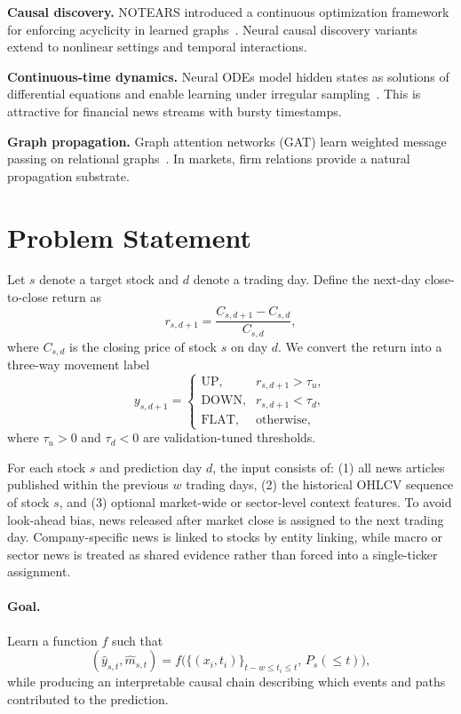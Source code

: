 \documentclass[sigconf,review]{acmart}
\begin{document}
\textbf{Causal discovery.} NOTEARS introduced a continuous optimization framework for enforcing acyclicity in learned graphs~\cite{zheng2018notears}. Neural causal discovery variants extend to nonlinear settings and temporal interactions.

\textbf{Continuous-time dynamics.} Neural ODEs model hidden states as solutions of differential equations and enable learning under irregular sampling~\cite{chen2018neuralode}. This is attractive for financial news streams with bursty timestamps.

\textbf{Graph propagation.} Graph attention networks (GAT) learn weighted message passing on relational graphs~\cite{velickovic2018gat}. In markets, firm relations provide a natural propagation substrate.

\section{Problem Statement}
Let \(s\) denote a target stock and \(d\) denote a trading day. Define the next-day close-to-close return as
\begin{equation}
r_{s,d+1} = \frac{C_{s,d+1} - C_{s,d}}{C_{s,d}},
\end{equation}
where \(C_{s,d}\) is the closing price of stock \(s\) on day \(d\). We convert the return into a three-way movement label
\begin{equation}
y_{s,d+1} =
\begin{cases}
\text{UP}, & r_{s,d+1} > \tau_u,\\
\text{DOWN}, & r_{s,d+1} < \tau_d,\\
\text{FLAT}, & \text{otherwise},
\end{cases}
\end{equation}
where \(\tau_u > 0\) and \(\tau_d < 0\) are validation-tuned thresholds.

For each stock \(s\) and prediction day \(d\), the input consists of: (1) all news articles published within the previous \(w\) trading days, (2) the historical OHLCV sequence of stock \(s\), and (3) optional market-wide or sector-level context features. To avoid look-ahead bias, news released after market close is assigned to the next trading day. Company-specific news is linked to stocks by entity linking, while macro or sector news is treated as shared evidence rather than forced into a single-ticker assignment.

\paragraph{Goal.} Learn a function \(f\) such that
\begin{equation}
(\hat{y}_{s,t}, \hat{m}_{s,t}) = f\big(\{(x_i,t_i)\}_{t-w\le t_i\le t},\, P_s(\le t)\big),
\end{equation}
while producing an interpretable causal chain describing which events and paths contributed to the prediction.
\end{document}
